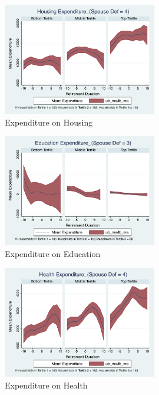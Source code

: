 \documentclass[11pt]{article}
\begin{document}
\clearpage

\begin{figure}[h]
	\caption{Expenditure on Housing}
	\centering
	\includegraphics[width=0.6\textwidth]{../ConsumptionPostRetirement_by_SpouseDef_Cats/Smoothed/4/spouse_def_total_housing_real.pdf}
\end{figure}


\begin{figure}[h]
	\caption{Expenditure on Education}
	\centering
	\includegraphics[width=0.6\textwidth]{../ConsumptionPostRetirement_by_SpouseDef_Cats/Smoothed/3/spouse_def_total_education_real.pdf}
\end{figure}
\clearpage

\begin{figure}[h]
	\caption{Expenditure on Health}
	\centering
	\includegraphics[width=0.6\textwidth]{../ConsumptionPostRetirement_by_SpouseDef_Cats/Smoothed/4/spouse_def_total_healthexpense_real.pdf}
\end{figure}
\end{document}
